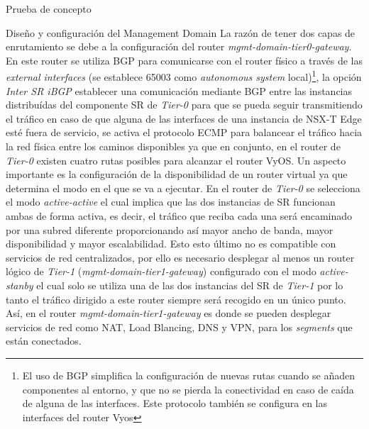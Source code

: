 \begin{section}{Prueba de concepto}
\begin{subsection}{Diseño y configuración del Management Domain}
    La razón de tener dos capas de enrutamiento se debe a la configuración del router \textit{mgmt-domain-tier0-gateway}. En este router se utiliza BGP para comunicarse con el router físico a través de las \textit{external interfaces} (se establece 65003 como \textit{autonomous system} local)\footnote{El uso de BGP simplifica la configuración de nuevas rutas cuando se añaden componentes al entorno, y que no se pierda la conectividad en caso de caída de alguna de las interfaces. Este protocolo también se configura en las interfaces del router Vyos}, la opción \textit{Inter SR iBGP} establecer una comunicación mediante BGP entre las instancias distribuídas del componente SR de \textit{Tier-0} para que se pueda seguir transmitiendo el tráfico en caso de que alguna de las interfaces de una instancia de NSX-T Edge esté fuera de servicio, se activa el protocolo ECMP para balancear el tráfico hacia la red física entre los caminos disponibles ya que en conjunto, en el router de \textit{Tier-0} existen cuatro rutas posibles para alcanzar el router VyOS. Un aspecto importante es la configuración de la disponibilidad de un router virtual ya que determina el modo en el que se va a ejecutar. En el router de \textit{Tier-0} se selecciona el modo \textit{active-active} el cual implica que las dos instancias de SR funcionan ambas de forma activa, es decir, el tráfico que reciba cada una será encaminado por una subred diferente proporcionando así mayor ancho de banda, mayor disponibilidad y mayor escalabilidad. Esto esto último no es compatible con servicios de red centralizados, por ello es necesario desplegar al menos un router lógico de \textit{Tier-1} (\textit{mgmt-domain-tier1-gateway}) configurado con el modo \textit{active-stanby} el cual solo se utiliza una de las dos instancias del SR de \textit{Tier-1} por lo tanto el tráfico dirigido a este router siempre será recogido en un único punto. Así, en el router \textit{mgmt-domain-tier1-gateway} es donde se pueden desplegar servicios de red como NAT, Load Blancing, DNS y VPN, para los \textit{segments} que están conectados.

    \end{subsection}
    
     
   
    \end{section}
